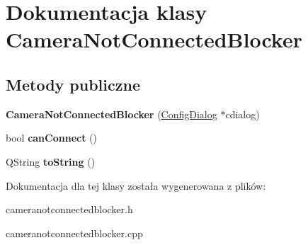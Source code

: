 \hypertarget{class_camera_not_connected_blocker}{
\section{Dokumentacja klasy CameraNotConnectedBlocker}
\label{class_camera_not_connected_blocker}
}
\subsection*{Metody publiczne}
\begin{DoxyCompactItemize}
\item 
\hypertarget{class_camera_not_connected_blocker_a36847155966f5fded3d9d5ae9a348be7}{
{\bfseries CameraNotConnectedBlocker} (\hyperlink{class_config_dialog}{ConfigDialog} $\ast$cdialog)}
\label{class_camera_not_connected_blocker_a36847155966f5fded3d9d5ae9a348be7}

\item 
\hypertarget{class_camera_not_connected_blocker_a6a2b84c9469178c7bdc3a40279ba17eb}{
bool {\bfseries canConnect} ()}
\label{class_camera_not_connected_blocker_a6a2b84c9469178c7bdc3a40279ba17eb}

\item 
\hypertarget{class_camera_not_connected_blocker_adc130d65f47c9e7d2a07d032c3f62ba5}{
QString {\bfseries toString} ()}
\label{class_camera_not_connected_blocker_adc130d65f47c9e7d2a07d032c3f62ba5}

\end{DoxyCompactItemize}


Dokumentacja dla tej klasy została wygenerowana z plików:\begin{DoxyCompactItemize}
\item 
cameranotconnectedblocker.h\item 
cameranotconnectedblocker.cpp\end{DoxyCompactItemize}
